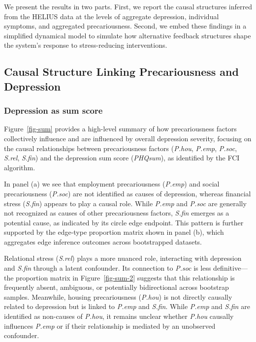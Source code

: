 \documentclass[
]{article}
\begin{document}
We present the results in two parts. First, we report the causal
structures inferred from the HELIUS data at the levels of aggregate
depression, individual symptoms, and aggregated precariousness. Second,
we embed these findings in a simplified dynamical model to simulate how
alternative feedback structures shape the system's response to
stress-reducing interventions.

\subsection{Causal Structure Linking Precariousness and
Depression}\label{causal-structure-linking-precariousness-and-depression}

\subsubsection{Depression as sum score}\label{depression-as-sum-score}

Figure~\ref{fig-sum} provides a high-level summary of how precariousness
factors collectively influence and are influenced by overall depression
severity, focusing on the causal relationships between precariousness
factors (\emph{P.hou}, \emph{P.emp}, \emph{P.soc}, \emph{S.rel},
\emph{S.fin}) and the depression sum score (\emph{PHQsum}), as
identified by the FCI algorithm.

In panel (a) we see that employment precariousness (\emph{P.emp}) and
social precariousness (\emph{P.soc}) are not identified as causes of
depression, whereas financial stress (\emph{S.fin}) appears to play a
causal role. While \emph{P.emp} and \emph{P.soc} are generally not
recognized as causes of other precariousness factors, \emph{S.fin}
emerges as a potential cause, as indicated by its circle edge endpoint.
This pattern is further supported by the edge-type proportion matrix
shown in panel (b), which aggregates edge inference outcomes across
bootstrapped datasets.

Relational stress (\emph{S.rel}) plays a more nuanced role, interacting
with depression and \emph{S.fin} through a latent confounder. Its
connection to \emph{P.soc} is less definitive---the proportion matrix in
Figure~\ref{fig-sum-2} suggests that this relationship is frequently
absent, ambiguous, or potentially bidirectional across bootstrap
samples. Meanwhile, housing precariousness (\emph{P.hou}) is not
directly causally related to depression but is linked to \emph{P.emp}
and \emph{S.fin}. While \emph{P.emp} and \emph{S.fin} are identified as
non-causes of \emph{P.hou}, it remains unclear whether \emph{P.hou}
causally influences \emph{P.emp} or if their relationship is mediated by
an unobserved confounder.
\end{document}
